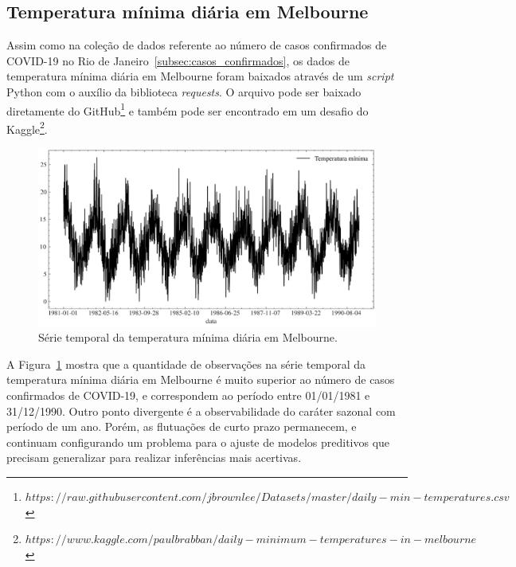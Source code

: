\FloatBarrier

\subsection{Temperatura mínima diária em Melbourne}
Assim como na coleção de dados referente ao número de casos confirmados de COVID-19 no Rio de Janeiro~\ref{subsec:casos_confirmados}, os dados de temperatura mínima diária em Melbourne foram baixados através de um \textit{script} Python com o auxílio da biblioteca \textit{requests}. O arquivo pode ser baixado diretamente do GitHub\footnote{$https://raw.githubusercontent.com/jbrownlee/Datasets/master/daily-min-temperatures.csv$} e também pode ser encontrado em um desafio do Kaggle\footnote{$https://www.kaggle.com/paulbrabban/daily-minimum-temperatures-in-melbourne$}.

\begin{figure}[!htp]
    \centering
    \includegraphics[width=5.0in]{img/temperatura_minima_diaria.pdf}
    \caption{Série temporal da temperatura mínima diária em Melbourne.}\label{fig:temperatura_minima_diaria}
\end{figure}

A Figura~\ref{fig:temperatura_minima_diaria} mostra que a quantidade de observações na série temporal da temperatura mínima diária em Melbourne é muito superior ao número de casos confirmados de COVID-19, e correspondem ao período entre 01/01/1981 e 31/12/1990. Outro ponto divergente é a observabilidade do caráter sazonal com período de um ano. Porém, as flutuações de curto prazo permanecem, e continuam configurando um problema para o ajuste de modelos preditivos que precisam generalizar para realizar inferências mais acertivas.

